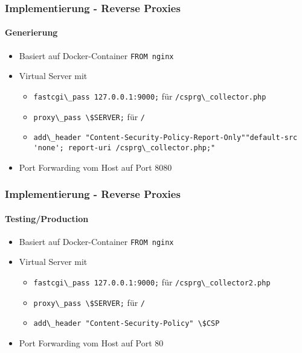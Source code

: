 \documentclass[handout]{beamer}
\begin{document}
\begin{frame}
\frametitle{Implementierung - Reverse Proxies}
\framesubtitle{Generierung}
\begin{itemize}
\item Basiert auf Docker-Container \colorbox{verylightgray}{\lstinline[basicstyle=\ttfamily\color{black}]|FROM nginx|}
\item Virtual Server mit
\begin{itemize}
\item \colorbox{verylightgray}{\lstinline[basicstyle=\ttfamily\color{black}]|fastcgi\_pass 127.0.0.1:9000;|} f\"ur \colorbox{verylightgray}{\lstinline[basicstyle=\ttfamily\color{black}]|/csprg\_collector.php|}
\item \colorbox{verylightgray}{\lstinline[basicstyle=\ttfamily\color{black}]|proxy\_pass \$SERVER;|} f\"ur \colorbox{verylightgray}{\lstinline[basicstyle=\ttfamily\color{black}]|/|}
\item \colorbox{verylightgray}{\lstinline[basicstyle=\ttfamily\color{black}]|add\_header "Content-Security-Policy-Report-Only"|}\newline\colorbox{verylightgray}{\lstinline[basicstyle=\ttfamily\color{black}]|"default-src 'none'; report-uri /csprg\_collector.php;"|}
\end{itemize}
\item Port Forwarding vom Host auf Port 8080
\end{itemize}
\end{frame}

\begin{frame}
\frametitle{Implementierung - Reverse Proxies}
\framesubtitle{Testing/Production}
\begin{itemize}
\item Basiert auf Docker-Container \colorbox{verylightgray}{\lstinline[basicstyle=\ttfamily\color{black}]|FROM nginx|}
\item Virtual Server mit
\begin{itemize}
\item \colorbox{verylightgray}{\lstinline[basicstyle=\ttfamily\color{black}]|fastcgi\_pass 127.0.0.1:9000;|} f\"ur \colorbox{verylightgray}{\lstinline[basicstyle=\ttfamily\color{black}]|/csprg\_collector2.php|}
\item \colorbox{verylightgray}{\lstinline[basicstyle=\ttfamily\color{black}]|proxy\_pass \$SERVER;|} f\"ur \colorbox{verylightgray}{\lstinline[basicstyle=\ttfamily\color{black}]|/|}
\item \colorbox{verylightgray}{\lstinline[basicstyle=\ttfamily\color{black}]|add\_header "Content-Security-Policy" \$CSP|}
\end{itemize}
\item Port Forwarding vom Host auf Port 80
\end{itemize}
\end{frame}
\end{document}
